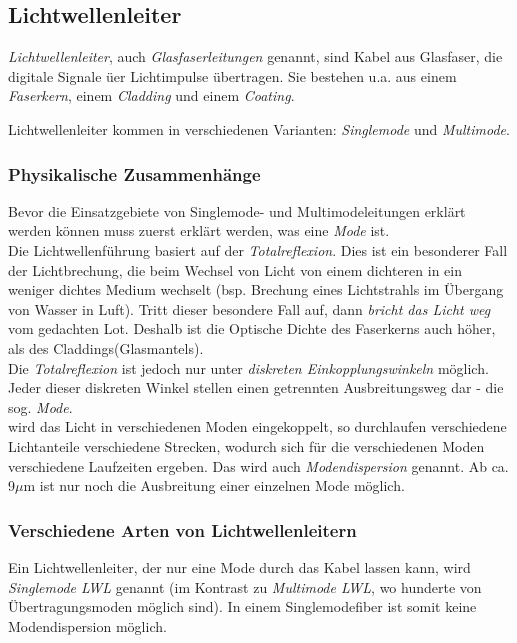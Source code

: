\documentclass[a4paper, 12pt]{report}
\begin{document}
\subsection{Lichtwellenleiter}

\emph{Lichtwellenleiter}, auch \emph{Glasfaserleitungen} genannt, sind 
Kabel aus Glasfaser, die digitale Signale üer Lichtimpulse übertragen. Sie 
bestehen u.a. aus einem \emph{Faserkern}, einem \emph{Cladding} und einem 
\emph{Coating}. 

Lichtwellenleiter kommen in verschiedenen Varianten: \emph{Singlemode} und 
\emph{Multimode}. 

\subsubsection{Physikalische Zusammenhänge}

Bevor die Einsatzgebiete von Singlemode- und Multimodeleitungen erklärt werden
können muss zuerst erklärt werden, was eine \emph{Mode} ist. \\ 

Die Lichtwellenführung basiert auf der \emph{Totalreflexion}. Dies ist ein
besonderer Fall der Lichtbrechung, die beim Wechsel von Licht von einem 
dichteren in ein weniger dichtes Medium wechselt (bsp. Brechung eines 
Lichtstrahls im Übergang von Wasser in Luft). Tritt dieser besondere Fall auf, 
dann \emph{bricht das Licht weg} vom gedachten \glqq Lot\grqq{}. Deshalb 
ist die Optische Dichte des Faserkerns auch höher, als des 
Claddings(Glasmantels). \\

Die \emph{Totalreflexion} ist jedoch nur unter \emph{diskreten 
Einkopplungswinkeln} möglich. Jeder dieser diskreten Winkel stellen einen 
getrennten Ausbreitungsweg dar - die sog. \emph{Mode}. \\

wird das Licht in verschiedenen Moden eingekoppelt, so durchlaufen verschiedene 
Lichtanteile verschiedene Strecken, wodurch sich für die verschiedenen Moden 
verschiedene Laufzeiten ergeben. Das wird auch \emph{Modendispersion} 
genannt. Ab ca. 9$\mu$m ist nur noch die Ausbreitung einer einzelnen Mode 
möglich. 

\newpage
\subsubsection{Verschiedene Arten von Lichtwellenleitern}

Ein Lichtwellenleiter, der nur eine Mode durch das Kabel lassen kann, wird 
\emph{Singlemode LWL} genannt (im Kontrast zu \emph{Multimode LWL}, wo
hunderte von Übertragungsmoden möglich sind). In einem Singlemodefiber ist somit
keine Modendispersion möglich. \\
\end{document}
